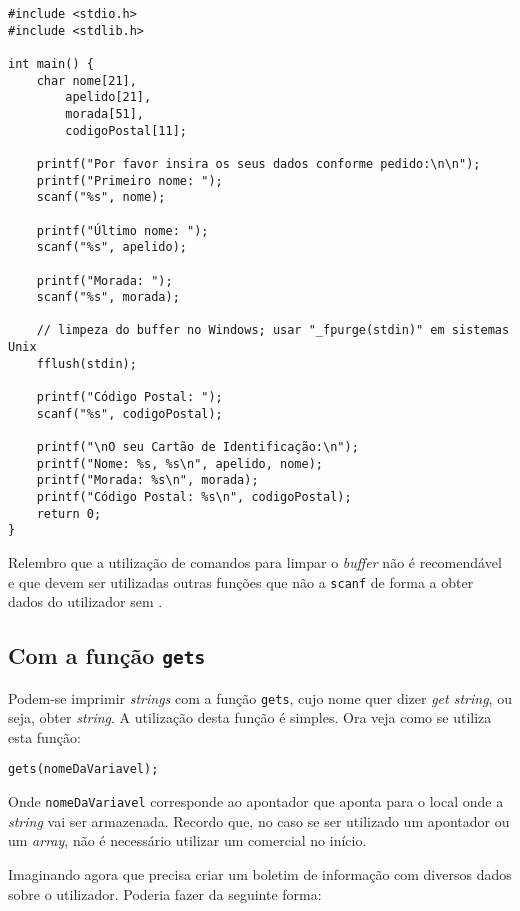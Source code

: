 \begin{lstlisting}
#include <stdio.h>
#include <stdlib.h>
 
int main() {
    char nome[21],
        apelido[21],
        morada[51],
        codigoPostal[11];
 
    printf("Por favor insira os seus dados conforme pedido:\n\n");
    printf("Primeiro nome: ");
    scanf("%s", nome);
 
    printf("Último nome: ");
    scanf("%s", apelido);
 
    printf("Morada: ");
    scanf("%s", morada);
 
    // limpeza do buffer no Windows; usar "_fpurge(stdin)" em sistemas Unix
    fflush(stdin);
 
    printf("Código Postal: ");
    scanf("%s", codigoPostal);
 
    printf("\nO seu Cartão de Identificação:\n");
    printf("Nome: %s, %s\n", apelido, nome);
    printf("Morada: %s\n", morada);
    printf("Código Postal: %s\n", codigoPostal);
    return 0;
}
\end{lstlisting}

Relembro que a utilização de comandos para limpar o \textit{buffer} não é recomendável e que devem ser utilizadas outras funções que não a \texttt{scanf} de forma a obter dados do utilizador sem .

\subsection{Com a função \texttt{gets}}

Podem-se imprimir \textit{strings} com a função \texttt{gets}, cujo nome quer dizer \textit{get string}, ou seja, obter \textit{string}. A utilização desta função é simples. Ora veja como se utiliza esta função:

\begin{lstlisting}
gets(nomeDaVariavel);
\end{lstlisting}

Onde \texttt{nomeDaVariavel} corresponde ao apontador que aponta para o local onde a \textit{string} vai ser armazenada. Recordo que, no caso se ser utilizado um apontador ou um \textit{array}, não é necessário utilizar um  comercial no início.

Imaginando agora que precisa criar um boletim de informação com diversos dados sobre o utilizador. Poderia fazer da seguinte forma:

